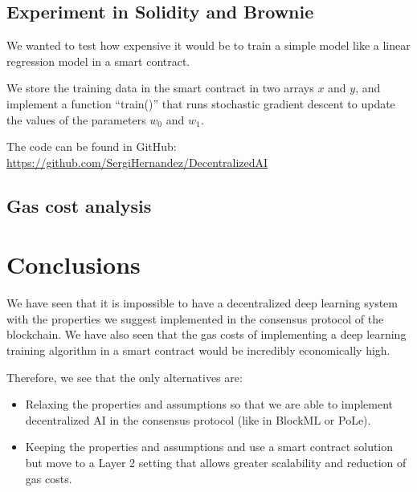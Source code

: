 \documentclass[conference]{IEEEtran}
\begin{document}
    \subsection{Experiment in Solidity and Brownie}
    We wanted to test how expensive it would be to train a simple model like a linear regression model in a smart contract.
    
    We store the training data in the smart contract in two arrays $x$ and $y$, and implement a function ``train()'' that runs stochastic gradient descent to update the values of the parameters $w_0$ and $w_1$.
    
    The code can be found in GitHub: \url{https://github.com/SergiHernandez/DecentralizedAI}
    
    \subsection{Gas cost analysis}
    
    \section{Conclusions}
    
    
    We have seen that it is impossible to have a decentralized deep learning system with the properties we suggest implemented in the consensus protocol of the blockchain. We have also seen that the gas costs of implementing a deep learning training algorithm in a smart contract would be incredibly economically high.
    
    Therefore, we see that the only alternatives are:
    \begin{itemize}
    \item Relaxing the properties and assumptions so that we are able to implement decentralized AI in the consensus protocol (like in BlockML or PoLe).
    \item Keeping the properties and assumptions and use a smart contract solution but move to a Layer 2 setting that allows greater scalability and reduction of gas costs.
    \end{itemize}
    
\end{document}
